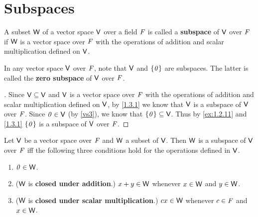 \section{Subspaces}\label{sec:1.3}

\begin{defn}\label{1.3.1}
	A subset \(\mathsf{W}\) of a vector space \(\mathsf{V}\) over a field \(\mathit{F}\) is called a \textbf{subspace} of \(\mathsf{V}\) over \(\mathit{F}\) if \(\mathsf{W}\) is a vector space over \(\mathit{F}\) with the operations of addition and scalar multiplication defined on \(\mathsf{V}\).
\end{defn}

\begin{eg}\label{1.3.2}
	In any vector space \(\mathsf{V}\) over \(\mathit{F}\), note that \(\mathsf{V}\) and \(\left\lbrace\mathit{0}\right\rbrace\) are subspaces.
	The latter is called the \textbf{zero subspace} of \(\mathsf{V}\) over \(\mathit{F}\).
\end{eg}

\begin{proof}[]
	Since \(\mathsf{V} \subseteq \mathsf{V}\) and \(\mathsf{V}\) is a vector space over \(\mathit{F}\) with the operations of addition and scalar multiplication defined on \(\mathsf{V}\), by \cref{1.3.1} we know that \(\mathsf{V}\) is a subspace of \(\mathsf{V}\) over \(\mathit{F}\).
	Since \(\mathit{0} \in \mathsf{V}\) (by \ref{vs3}), we know that \(\left\lbrace\mathit{0}\right\rbrace \subseteq \mathsf{V}\).
	Thus by \cref{ex:1.2.11} and \cref{1.3.1} \(\left\lbrace\mathit{0}\right\rbrace\) is a subspace of \(\mathsf{V}\) over \(\mathit{F}\).
\end{proof}

\begin{thm}\label{1.3}
	Let \(\mathsf{V}\) be a vector space over \(\mathit{F}\) and \(\mathsf{W}\) a subset of \(\mathsf{V}\).
	Then \(\mathsf{W}\) is a subspace of \(\mathsf{V}\) over \(\mathit{F}\) iff the following three conditions hold for the operations defined in \(\mathsf{V}\).
	\begin{enumerate}
		\item \(\mathit{0} \in \mathsf{W}\).
		\item (\(\mathsf{W}\) is \textbf{closed under addition}.)
		      \(x + y \in \mathsf{W}\) whenever \(x \in \mathsf{W}\) and \(y \in \mathsf{W}\).
		\item (\(\mathsf{W}\) is \textbf{closed under scalar multiplication}.)
		      \(cx \in \mathsf{W}\) whenever \(c \in \mathit{F}\) and \(x \in \mathsf{W}\).
	\end{enumerate}
\end{thm}

